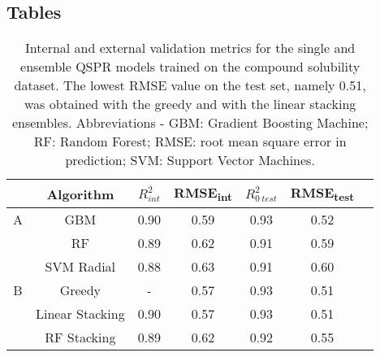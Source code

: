\documentclass{bmcart}
\begin{document}
\begin{backmatter}
\section*{Tables}
\begin{table}[htb!]
\centering
\begin{tabular}[0.5width=\textwidth]{cccccc p{1cm}}
\hline
&   Algorithm & $R^{2}_{int}$   & RMSE\textsubscript{int} & $R^{2}_{0\ test}$ & RMSE\textsubscript{test}\\
\hline
A &   GBM         &   0.90 &    0.59 & 0.93 & 0.52\\
&   RF          &   0.89 &   0.62  & 0.91 & 0.59\\
  &    SVM Radial &   0.88 &   0.63  & 0.91 & 0.60\\
\hline
B &   Greedy      &   -  &  0.57    &  0.93    &   0.51\\
  &   Linear Stacking & 0.90 & 0.57 & 0.93 & 0.51\\
&   RF Stacking & 0.89 & 0.62 & 0.92 & 0.55\\
\hline
\end{tabular}
\caption{Internal and external validation metrics for the single and ensemble QSPR models trained on the compound solubility dataset.
The lowest RMSE value on the test set, namely 0.51, was obtained with the greedy and with
the linear stacking ensembles. Abbreviations - GBM: Gradient Boosting Machine; RF: Random Forest; RMSE: root mean square error in prediction; SVM: Support Vector Machines.}
\label{tab:logs_perf}
\end{table}


\end{backmatter}
\end{document}
